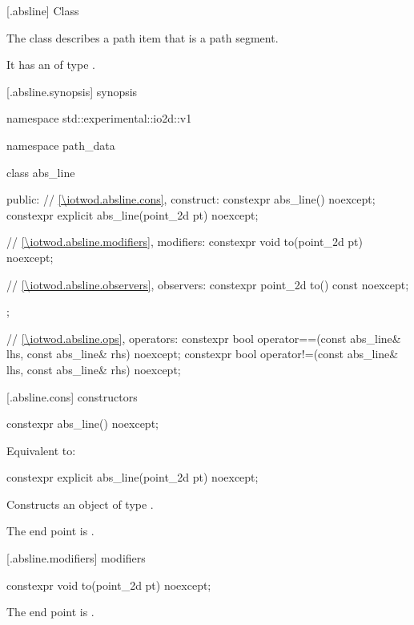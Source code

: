  [\iotwod.absline] {Class }

\pnum
{}%
The class  describes a path item that is a path segment.

\pnum
It has an  of type .

 [\iotwod.absline.synopsis] { synopsis}

\begin{codeblock}
namespace std::experimental::io2d::v1 {
  namespace path_data {
    class abs_line {
    public:
      // \ref{\iotwod.absline.cons}, construct:
      constexpr abs_line() noexcept;
      constexpr explicit abs_line(point_2d pt) noexcept;

      // \ref{\iotwod.absline.modifiers}, modifiers:
      constexpr void to(point_2d pt) noexcept;

      // \ref{\iotwod.absline.observers}, observers:
      constexpr point_2d to() const noexcept;
    };
    
    // \ref{\iotwod.absline.ops}, operators:
    constexpr bool operator==(const abs_line& lhs, const abs_line& rhs) 
      noexcept;
    constexpr bool operator!=(const abs_line& lhs, const abs_line& rhs) 
      noexcept;
  }
}
\end{codeblock}

 [\iotwod.absline.cons] { constructors}

%
\begin{itemdecl}
constexpr abs_line() noexcept;
\end{itemdecl}
\begin{itemdescr}
\pnum
\effects
Equivalent to: 
\end{itemdescr}

%
\begin{itemdecl}
constexpr explicit abs_line(point_2d pt) noexcept;
\end{itemdecl}
\begin{itemdescr}
\pnum
\effects
Constructs an object of type .

\pnum
The end point is .
\end{itemdescr}

 [\iotwod.absline.modifiers]{ modifiers}

%
\begin{itemdecl}
constexpr void to(point_2d pt) noexcept;
\end{itemdecl}
\begin{itemdescr}
\pnum
\effects
The end point is .
\end{itemdescr}

